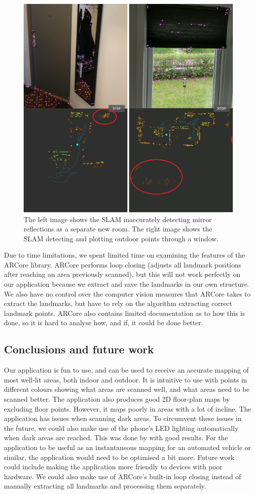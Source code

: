 \documentclass{article}
\begin{document}
\begin{figure}[!htb]
    \centering
    \includegraphics[width=0.6\linewidth]{mirror-window-examples.png}
    \caption{The left image shows the SLAM inaccurately detecting mirror reflections as a separate new room. The right image shows the SLAM detecting and plotting outdoor points through a window.}
    \label{fig:mirror-window-examples}
\end{figure}

Due to time limitations, we spent limited time on examining the features of the ARCore library. ARCore performs loop closing (adjusts all landmark positions after reaching an area previously scanned), but this will not work perfectly on our application because we extract and save the landmarks in our own structure. We also have no control over the computer vision measures that ARCore takes to extract the landmarks, but have to rely on the algorithm extracting correct landmark points. ARCore also contains limited documentation as to how this is done, so it is hard to analyse how, and if, it could be done better.

\newpage
\subsection{Conclusions and future work}
Our application is fun to use, and can be used to receive an accurate mapping of most well-lit areas, both indoor and outdoor. It is intuitive to use with points in different colours showing what areas are scanned well, and what areas need to be scanned better. The application also produces good 2D floor-plan maps by excluding floor points. However, it maps poorly in areas with a lot of incline. The application has issues when scanning dark areas. To circumvent these issues in the future, we could also make use of the phone's LED lighting automatically when dark areas are reached. This was done by \cite{dark} with good results. For the application to be useful as an instantaneous mapping for an automated vehicle or similar, the application would need to be optimised a bit more. Future work could include making the application more friendly to devices with poor hardware. We could also make use of ARCore's built-in loop closing instead of manually extracting all landmarks and processing them separately.
\end{document}
